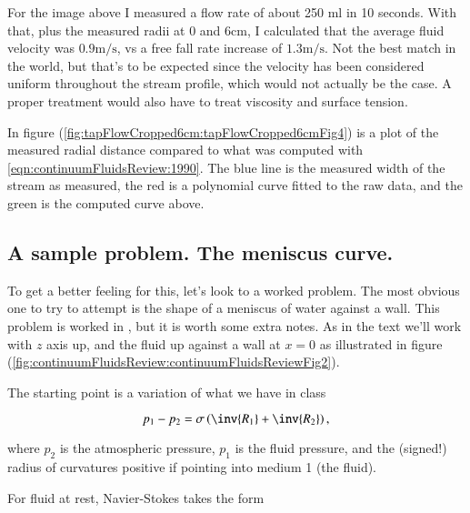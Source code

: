 For the image above I measured a flow rate of about 250 ml in 10 seconds.  With that, plus the measured radii at 0 and $6 \text{cm}$, I calculated that the average fluid velocity was $0.9 \text{m}/\text{s}$, vs a free fall rate increase of $1.3 \text{m}/\text{s}$.  Not the best match in the world, but that's to be expected since the velocity has been considered uniform throughout the stream profile, which would not actually be the case.  A proper treatment would also have to treat viscosity and surface tension.

In figure (\ref{fig:tapFlowCropped6cm:tapFlowCropped6cmFig4}) is a plot of the measured radial distance compared to what was computed with \ref{eqn:continuumFluidsReview:1990}.  The blue line is the measured width of the stream as measured, the red is a polynomial curve fitted to the raw data, and the green is the computed curve above.


\subsection{A sample problem.  The meniscus curve.}

To get a better feeling for this, let's look to a worked problem.  The most obvious one to try to attempt is the shape of a meniscus of water against a wall.  This problem is worked in \cite{landau1987course}, but it is worth some extra notes.  As in the text we'll work with $z$ axis up, and the fluid up against a wall at $x = 0$ as illustrated in figure (\ref{fig:continuumFluidsReview:continuumFluidsReviewFig2}).


The starting point is a variation of what we have in class

\begin{equation}\label{eqn:continuumFluidsReview:1530}
p_1 - p_2 = \sigma \left( \inv{R_1} + \inv{R_2} \right),
\end{equation}

where $p_2$ is the atmospheric pressure, $p_1$ is the fluid pressure, and the (signed!) radius of curvatures positive if pointing into medium 1 (the fluid).

For fluid at rest, Navier-Stokes takes the form

